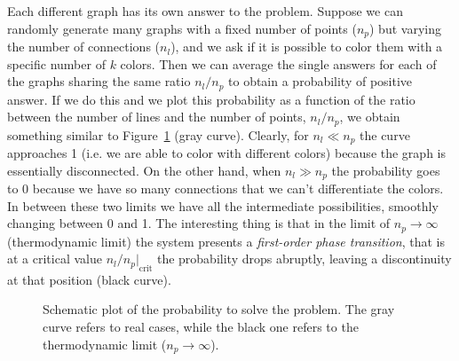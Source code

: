 Each different graph has its own answer to the problem. Suppose we can randomly generate many graphs with a fixed number of points ($n_p$) but varying the number of connections ($n_l$), and we ask if it is possible to color them with a specific number of $k$ colors. Then we can average the single answers for each of the graphs sharing the same ratio $n_l/n_p$ to obtain a probability of positive answer. If we do this and we plot this probability as a function of the ratio between the number of lines and the number of points, $n_l/n_p$, we obtain something similar to Figure~\ref{ProbColor} (gray curve). Clearly, for $n_l\ll n_p$ the curve approaches 1 (i.e. we are able to color with different colors) because the graph is essentially disconnected. On the other hand, when $n_l\gg n_p$ the probability goes to 0 because we have so many connections that we can't differentiate the colors. In between these two limits we have all the intermediate possibilities, smoothly changing between 0 and 1. The interesting thing is that in the limit of $n_p\rightarrow\infty$ (thermodynamic limit) the system presents a \emph{first-order phase transition}, that is at a critical value ${n_l/n_p\bigr|}_{\text{crit}}$ the probability drops abruptly, leaving a discontinuity at that position (black curve).
\begin{figure}[ht]
\centering
\pgfplotsset{set layers}
\caption{Schematic plot of the probability to solve the problem. The gray curve refers to real cases, while the black one refers to the thermodynamic limit ($n_p\rightarrow\infty$).}\label{ProbColor}
\end{figure}

